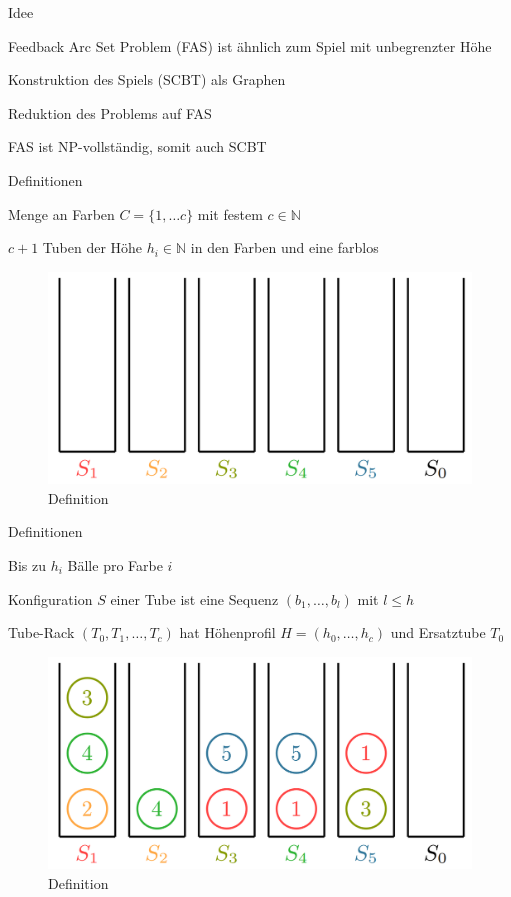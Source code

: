 \documentclass{beamer}
\begin{document}
\begin{frame}{Idee}
	\begin{pointlist}
		\item Feedback Arc Set Problem (FAS) ist ähnlich zum Spiel mit unbegrenzter Höhe
		\item Konstruktion des Spiels (SCBT) als Graphen 
		\item Reduktion des Problems auf FAS
		\item FAS ist NP-vollständig, somit auch SCBT
	\end{pointlist}
\end{frame}

\begin{frame}{Definitionen}
	\begin{pointlist}
		\item Menge an Farben $C=\{1,\dots c\}$ mit festem $c\in \mathbb{N}$
		\item $c+1$ Tuben der Höhe $h_i\in\mathbb{N}$ in den Farben und eine farblos
		\end{pointlist}
		
\begin{figure}[ht]
		\includegraphics[width=.65\textwidth]{def0}
		\caption{Definition}
    \end{figure}
		\end{frame}
		
		\begin{frame}{Definitionen}
	\begin{pointlist}
		\item Bis zu $h_i$ Bälle pro Farbe $i$
		\item Konfiguration $S$ einer Tube ist eine Sequenz $(b_1,\dots,b_l)$ mit $l\leq h$
		\item Tube-Rack $(T_0, T_1,\dots,T_c)$ hat Höhenprofil $H=(h_0,\dots,h_c)$ und Ersatztube $T_0$
		\end{pointlist}
		
\begin{figure}[ht]
		\includegraphics[width=.65\textwidth]{def}
		\caption{Definition}
    \end{figure}
		\end{frame}
		
\end{document}
